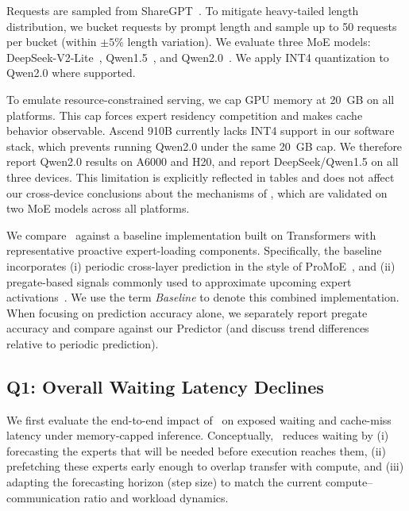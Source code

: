Requests are sampled from ShareGPT~\cite{ShareGPT_Vicuna_unfiltered}.
To mitigate heavy-tailed length distribution, we bucket requests by prompt length
and sample up to 50 requests per bucket (within $\pm 5\%$ length variation).
We evaluate three MoE models: DeepSeek-V2-Lite~\cite{DeepSeekCoderV2LiteBase, bi2024deepseek, deepseekai2024deepseekv2strongeconomicalefficient},
Qwen1.5~\cite{Qwen15MoEA27B, qwen_moe}, and Qwen2.0~\cite{Qwen257BA14BInstructGPTQInt4, qwen2}.
We apply INT4 quantization to Qwen2.0 where supported.

To emulate resource-constrained serving, we cap GPU memory at 20~GB on all
platforms.
This cap forces expert residency competition and makes cache behavior observable.
Ascend 910B currently lacks INT4 support in our software stack, which prevents
running Qwen2.0 under the same 20~GB cap.
We therefore report Qwen2.0 results on A6000 and H20, and report DeepSeek/Qwen1.5
on all three devices.
This limitation is explicitly reflected in tables and does not affect our
cross-device conclusions about the mechanisms of \systemname, which are validated
on two MoE models across all platforms.

We compare \systemname\ against a baseline implementation built on Transformers
with representative proactive expert-loading components.
Specifically, the baseline incorporates (i) periodic cross-layer prediction in
the style of ProMoE~\cite{song2024promoe}, and (ii) pregate-based signals commonly
used to approximate upcoming expert activations~\cite{eliseev2023fast}.
We use the term \emph{Baseline} to denote this combined implementation.
When focusing on prediction accuracy alone, we separately report pregate accuracy
and compare against our Predictor (and discuss trend differences relative to
periodic prediction).

\subsection{Q1: Overall Waiting Latency Declines}
\label{sec:eval:q1}

We first evaluate the end-to-end impact of \systemname\ on exposed waiting and
cache-miss latency under memory-capped inference.
Conceptually, \systemname\ reduces waiting by (i) forecasting the experts that will
be needed before execution reaches them, (ii) prefetching these experts early enough
to overlap transfer with compute, and (iii) adapting the forecasting horizon (step
size) to match the current compute--communication ratio and workload dynamics.

